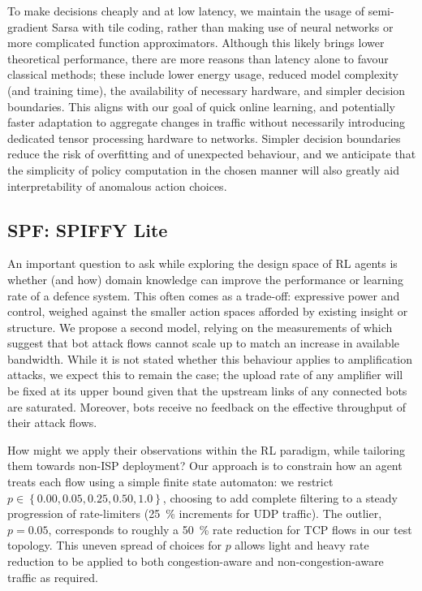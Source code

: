 \documentclass[conference, a4paper, 10pt, times]{IEEEtran}
\begin{document}
To make decisions cheaply and at low latency, we maintain the usage of semi-gradient Sarsa with tile coding, rather than making use of neural networks or more complicated function approximators.
Although this likely brings lower theoretical performance, there are more reasons than latency alone to favour classical methods; these include lower energy usage, reduced model complexity (and training time), the availability of necessary hardware, and simpler decision boundaries.
This aligns with our goal of quick online learning, and potentially faster adaptation to aggregate changes in traffic without necessarily introducing dedicated tensor processing hardware to networks.
Simpler decision boundaries reduce the risk of overfitting and of unexpected behaviour, and we anticipate that the simplicity of policy computation in the chosen manner will also greatly aid interpretability of anomalous action choices.


\subsection{SPF: SPIFFY Lite}

An important question to ask while exploring the design space of RL agents is whether (and how) domain knowledge can improve the performance or learning rate of a defence system.
This often comes as a trade-off: expressive power and control, weighed against the smaller action spaces afforded by existing insight or structure.
We propose a second model, relying on the measurements of \textcite{DBLP:conf/ndss/KangGS16} which suggest that bot attack flows cannot scale up to match an increase in available bandwidth.
While it is not stated whether this behaviour applies to amplification attacks, we expect this to remain the case; the upload rate of any amplifier will be fixed at its upper bound given that the upstream links of any connected bots are saturated.
Moreover, bots receive no feedback on the effective throughput of their attack flows.

How might we apply their observations within the RL paradigm, while tailoring them towards non-ISP deployment?
Our approach is to constrain how an agent treats each flow using a simple finite state automaton: we restrict $p \in \left\{ 0.00, 0.05, 0.25, 0.50, 1.0 \right\}$, choosing to add complete filtering to a steady progression of rate-limiters (\SI{25}{\percent} increments for UDP traffic).
The outlier, $p=0.05$, corresponds to roughly a \SI{50}{\percent} rate reduction for TCP flows in our test topology.
This uneven spread of choices for $p$ allows light and heavy rate reduction to be applied to both congestion-aware and non-congestion-aware traffic as required.
\end{document}
